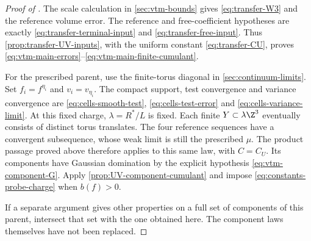 \begin{proof}[Proof of ]
The scale calculation in \cref{sec:vtm-bounds} gives
\eqref{eq:transfer-W3} and the reference volume error.
The reference and free-coefficient hypotheses are exactly
\eqref{eq:transfer-terminal-input} and \eqref{eq:transfer-free-input}.
Thus \cref{prop:transfer-UV-inputs}, with the uniform constant
\eqref{eq:transfer-CU}, proves
\eqref{eq:vtm-main-errors}--\eqref{eq:vtm-main-finite-cumulant}.

For the prescribed parent, use the finite-torus diagonal
in \cref{sec:continuum-limits}. Set
$f_i=f^{\eta_i}$ and $v_i=v_{\eta_i}$.
The compact support, test convergence and variance convergence
are \eqref{eq:cells-smooth-test},
\eqref{eq:cells-test-error} and \eqref{eq:cells-variance-limit}.
At this fixed charge, $\lambda=R^*/L$ is fixed.
Each finite $Y\subset\lambda\Z^3$ eventually consists of
distinct torus translates. The four reference sequences have
a convergent subsequence, whose weak limit is still the
prescribed $\mu$. The product passage proved above therefore
applies to this same law, with $C=C_U$.
Its components have Gaussian domination by the explicit
hypothesis \eqref{eq:vtm-component-G}.
Apply \cref{prop:UV-component-cumulant} and impose
\eqref{eq:constants-probe-charge} when $b(f)>0$.

If a separate argument gives other properties on a full set
of components of this parent, intersect that set with the
one obtained here. The component laws themselves have not
been replaced.
\end{proof}
